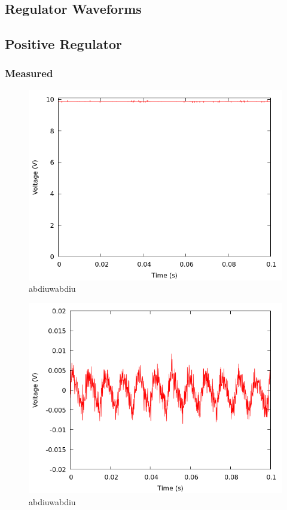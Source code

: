 \documentclass[12pt]{article}
\newcommand{\graphwidth}{0.5\linewidth}
\begin{document}
\begin{appendix}
\section{Regulator Waveforms}

\subsection{Positive Regulator}

\subsubsection{Measured}

\begin{figure}[H]
    \centering
    \includegraphics[width=\graphwidth]{./res/image/pos-fullload.png}
    \caption{abdiuwabdiu}
    \label{fig:pos_fullload}
\end{figure}

\begin{figure}[H]
    \centering
    \includegraphics[width=\graphwidth]{./res/image/pos-fullload-ripple.png}
    \caption{abdiuwabdiu}
    \label{fig:pos_fullload_ripple}
\end{figure}


\end{appendix}
\end{document}
